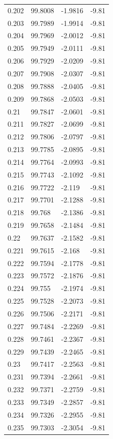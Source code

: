 \begin{tabular}{llll}
0.202 & 99.8008 & -1.9816 & -9.81 \\
0.203 & 99.7989 & -1.9914 & -9.81 \\
0.204 & 99.7969 & -2.0012 & -9.81 \\
0.205 & 99.7949 & -2.0111 & -9.81 \\
0.206 & 99.7929 & -2.0209 & -9.81 \\
0.207 & 99.7908 & -2.0307 & -9.81 \\
0.208 & 99.7888 & -2.0405 & -9.81 \\
0.209 & 99.7868 & -2.0503 & -9.81 \\
0.21 & 99.7847 & -2.0601 & -9.81 \\
0.211 & 99.7827 & -2.0699 & -9.81 \\
0.212 & 99.7806 & -2.0797 & -9.81 \\
0.213 & 99.7785 & -2.0895 & -9.81 \\
0.214 & 99.7764 & -2.0993 & -9.81 \\
0.215 & 99.7743 & -2.1092 & -9.81 \\
0.216 & 99.7722 & -2.119 & -9.81 \\
0.217 & 99.7701 & -2.1288 & -9.81 \\
0.218 & 99.768 & -2.1386 & -9.81 \\
0.219 & 99.7658 & -2.1484 & -9.81 \\
0.22 & 99.7637 & -2.1582 & -9.81 \\
0.221 & 99.7615 & -2.168 & -9.81 \\
0.222 & 99.7594 & -2.1778 & -9.81 \\
0.223 & 99.7572 & -2.1876 & -9.81 \\
0.224 & 99.755 & -2.1974 & -9.81 \\
0.225 & 99.7528 & -2.2073 & -9.81 \\
0.226 & 99.7506 & -2.2171 & -9.81 \\
0.227 & 99.7484 & -2.2269 & -9.81 \\
0.228 & 99.7461 & -2.2367 & -9.81 \\
0.229 & 99.7439 & -2.2465 & -9.81 \\
0.23 & 99.7417 & -2.2563 & -9.81 \\
0.231 & 99.7394 & -2.2661 & -9.81 \\
0.232 & 99.7371 & -2.2759 & -9.81 \\
0.233 & 99.7349 & -2.2857 & -9.81 \\
0.234 & 99.7326 & -2.2955 & -9.81 \\
0.235 & 99.7303 & -2.3054 & -9.81 \\

\end{tabular}
